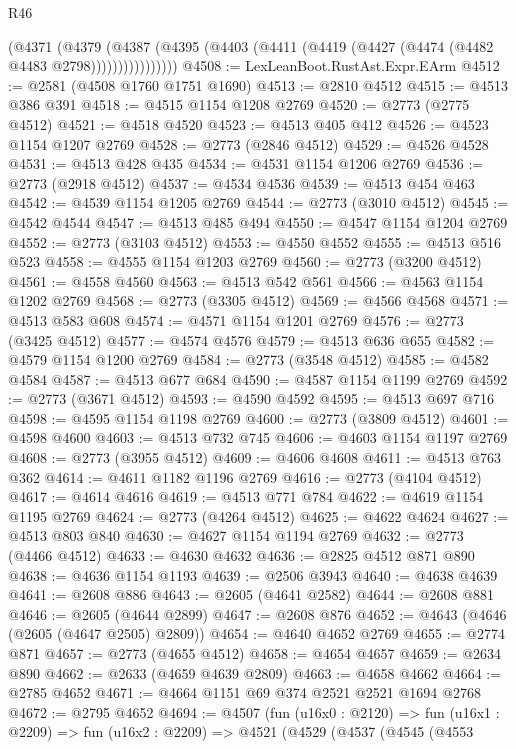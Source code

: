 \begin{lexlean}{R46}
\begin{coremodule}
                (@4371
                  (@4379
                    (@4387
                      (@4395 (@4403 (@4411 (@4419 (@4427 (@4474 (@4482 @4483 @2798))))))))))))))))
@4508 := LexLeanBoot.RustAst.Expr.EArm
@4512 := @2581 (@4508 @1760 @1751 @1690)
@4513 := @2810 @4512
@4515 := @4513 @386 @391
@4518 := @4515 @1154 @1208 @2769
@4520 := @2773 (@2775 @4512)
@4521 := @4518 @4520
@4523 := @4513 @405 @412
@4526 := @4523 @1154 @1207 @2769
@4528 := @2773 (@2846 @4512)
@4529 := @4526 @4528
@4531 := @4513 @428 @435
@4534 := @4531 @1154 @1206 @2769
@4536 := @2773 (@2918 @4512)
@4537 := @4534 @4536
@4539 := @4513 @454 @463
@4542 := @4539 @1154 @1205 @2769
@4544 := @2773 (@3010 @4512)
@4545 := @4542 @4544
@4547 := @4513 @485 @494
@4550 := @4547 @1154 @1204 @2769
@4552 := @2773 (@3103 @4512)
@4553 := @4550 @4552
@4555 := @4513 @516 @523
@4558 := @4555 @1154 @1203 @2769
@4560 := @2773 (@3200 @4512)
@4561 := @4558 @4560
@4563 := @4513 @542 @561
@4566 := @4563 @1154 @1202 @2769
@4568 := @2773 (@3305 @4512)
@4569 := @4566 @4568
@4571 := @4513 @583 @608
@4574 := @4571 @1154 @1201 @2769
@4576 := @2773 (@3425 @4512)
@4577 := @4574 @4576
@4579 := @4513 @636 @655
@4582 := @4579 @1154 @1200 @2769
@4584 := @2773 (@3548 @4512)
@4585 := @4582 @4584
@4587 := @4513 @677 @684
@4590 := @4587 @1154 @1199 @2769
@4592 := @2773 (@3671 @4512)
@4593 := @4590 @4592
@4595 := @4513 @697 @716
@4598 := @4595 @1154 @1198 @2769
@4600 := @2773 (@3809 @4512)
@4601 := @4598 @4600
@4603 := @4513 @732 @745
@4606 := @4603 @1154 @1197 @2769
@4608 := @2773 (@3955 @4512)
@4609 := @4606 @4608
@4611 := @4513 @763 @362
@4614 := @4611 @1182 @1196 @2769
@4616 := @2773 (@4104 @4512)
@4617 := @4614 @4616
@4619 := @4513 @771 @784
@4622 := @4619 @1154 @1195 @2769
@4624 := @2773 (@4264 @4512)
@4625 := @4622 @4624
@4627 := @4513 @803 @840
@4630 := @4627 @1154 @1194 @2769
@4632 := @2773 (@4466 @4512)
@4633 := @4630 @4632
@4636 := @2825 @4512 @871 @890
@4638 := @4636 @1154 @1193
@4639 := @2506 @3943
@4640 := @4638 @4639
@4641 := @2608 @886
@4643 := @2605 (@4641 @2582)
@4644 := @2608 @881
@4646 := @2605 (@4644 @2899)
@4647 := @2608 @876
@4652 := @4643 (@4646 (@2605 (@4647 @2505) @2809))
@4654 := @4640 @4652 @2769
@4655 := @2774 @871
@4657 := @2773 (@4655 @4512)
@4658 := @4654 @4657
@4659 := @2634 @890
@4662 := @2633 (@4659 @4639 @2809)
@4663 := @4658 @4662
@4664 := @2785 @4652
@4671 := @4664 @1151 @69 @374 @2521 @2521 @1694 @2768
@4672 := @2795 @4652
@4694 := @4507
    (fun (u16x0 : @2120) =>
    fun (u16x1 : @2209) =>
    fun (u16x2 : @2209) =>
    @4521
      (@4529
        (@4537
          (@4545
            (@4553

\end{coremodule}
\end{lexlean}
